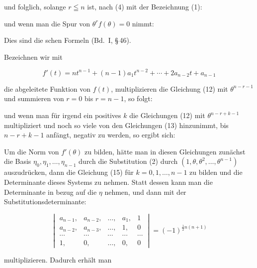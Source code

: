 und folglich, solange $r \leqq n$ ist, nach (4) mit der Bezeichnung (1):


und wenn man die Spur von $\theta^r f(\theta) = 0$ nimmt:


Dies sind die schen Formeln (Bd.\ I, \S\,46).

Bezeichnen wir mit

\[
f'(t) = n t^{n-1} + (n-1)a_1 t^{n-2} + \cdots + 2a_{n-2}t + a_{n-1}
\]

die abgeleitete Funktion von $f(t)$, multiplizieren die Gleichung (12) mit
$\theta^{n-r-1}$ und summieren von $r=0$ bis $r=n-1$, so folgt:


und wenn man f\"ur irgend ein positives $k$ die Gleichungen (12) mit
$\theta^{n-r+k-1}$ multipliziert und noch so viele von den Gleichungen (13) hinzunimmt,
bis $n-r+k-1$ anf\"angt, negativ zu werden, so ergibt sich:


Um die Norm von $f'(\theta)$ zu bilden, h\"atte man in diesen Gleichungen zun\"achst die
Basis $\eta_0, \eta_1, \ldots, \eta_{n-1}$ durch die Substitution (2) durch
$(1, \theta, \theta^2, \ldots, \theta^{n-1})$ auszudr\"ucken, dann die Gleichung (15) f\"ur
$k = 0, 1, \ldots, n-1$ zu bilden und die Determinante dieses Systems zu nehmen. Statt
dessen kann man die Determinante in bezug auf die $\eta$ nehmen, und dann mit der
Substitutionsdeterminante:

\[
\begin{vmatrix}
a_{n-1}, & a_{n-2}, & \ldots, & a_1, & 1 \\
a_{n-2}, & a_{n-3}, & \ldots, & 1, & 0 \\
\cdots & \cdots & \cdots & \cdots & \cdots \\
1, & 0, & \ldots, & 0, & 0
\end{vmatrix}
= (-1)^{\frac{1}{2}n(n+1)}
\]

multiplizieren. Dadurch erh\"alt man

